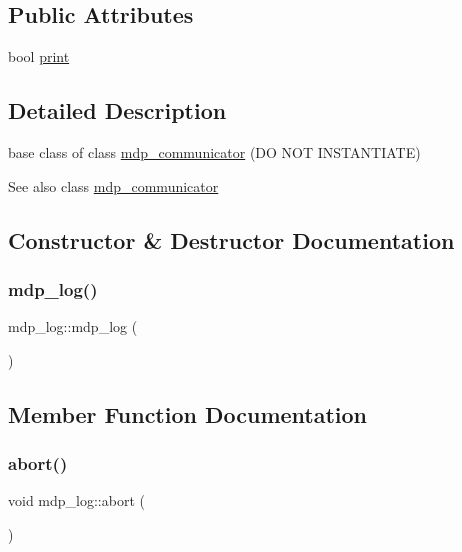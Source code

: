 \subsection*{Public Attributes}
\begin{DoxyCompactItemize}
\item 
bool \hyperlink{classmdp__log_a1330daef61266763f9a736300a1eac49}{print}
\end{DoxyCompactItemize}


\subsection{Detailed Description}
base class of class \hyperlink{classmdp__communicator}{mdp\+\_\+communicator} (DO N\+OT I\+N\+S\+T\+A\+N\+T\+I\+A\+TE) 

\begin{DoxySeeAlso}{See also}
class \hyperlink{classmdp__communicator}{mdp\+\_\+communicator} 
\end{DoxySeeAlso}


\subsection{Constructor \& Destructor Documentation}
\mbox{\label{classmdp__log_a76a398101c2618249099be4fda3ce26c}} 
\subsubsection{\texorpdfstring{mdp\+\_\+log()}{mdp\_log()}}
{\footnotesize\ttfamily mdp\+\_\+log\+::mdp\+\_\+log (\begin{DoxyParamCaption}{ }\end{DoxyParamCaption})\hspace{0.3cm}{\ttfamily [inline]}}



\subsection{Member Function Documentation}
\mbox{\label{classmdp__log_a0e85794c9c7fdaf944eb70d1f2c0ecc5}} 
\subsubsection{\texorpdfstring{abort()}{abort()}}
{\footnotesize\ttfamily void mdp\+\_\+log\+::abort (\begin{DoxyParamCaption}{ }\end{DoxyParamCaption})\hspace{0.3cm}{\ttfamily [inline]}}

